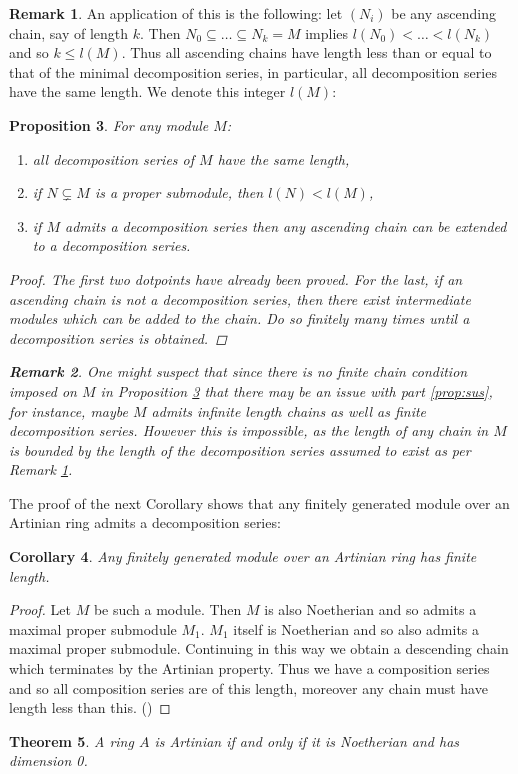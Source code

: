 \documentclass[12pt]{article}
\theoremstyle{plain}
\newtheorem{thm}{Theorem}[subsection] %
\newtheorem{proposition}[thm]{Proposition}
\newtheorem{cor}[thm]{Corollary}
\theoremstyle{definition}
\newtheorem{remark}[thm]{Remark}
\begin{document}
	\begin{remark}
		\label{remark:saving_grace}
		An application of this is the following: let $(N_i)$ be any ascending chain, say of length $k$. Then $N_0 \subseteq \hdots \subseteq N_k = M$ implies $l(N_0) < \hdots < l(N_k)$ and so $k \leq l(M)$. Thus all ascending chains have length less than or equal to that of the minimal decomposition series, in particular, all decomposition series have the same length. We denote this integer $l(M)$:
	\end{remark}
	\begin{proposition}
		\label{prop:decomposition_series_basics}
		For any module $M$:
		\begin{enumerate}
			\item all decomposition series of $M$ have the same length,
			\item if $N \subsetneq M$ is a proper submodule, then $l(N)<l(M)$,
			\item\label{prop:sus} if $M$ admits a decomposition series then any ascending chain can be extended to a decomposition series.
		\end{enumerate}
		\begin{proof}
			The first two dotpoints have already been proved. For the last, if an ascending chain is not a decomposition series, then there exist intermediate modules which can be added to the chain. Do so finitely many times until a decomposition series is obtained.
		\end{proof}
		\begin{remark}
			One might suspect that since there is no finite chain condition imposed on $M$ in Proposition \ref{prop:decomposition_series_basics} that there may be an issue with part \ref{prop:sus}, for instance, maybe $M$ admits infinite length chains as well as finite decomposition series. However this is impossible, as the length of any chain in $M$ is bounded by the length of the decomposition series assumed to exist as per Remark \ref{remark:saving_grace}.
		\end{remark}
	\end{proposition}
	The proof of the next Corollary shows that any finitely generated module over an Artinian ring admits a decomposition series:
	\begin{cor}
		Any finitely generated module over an Artinian ring has finite length.
	\end{cor}
	\begin{proof}
		Let $M$ be such a module. Then $M$ is also Noetherian and so admits a maximal proper submodule $M_1$. $M_1$ itself is Noetherian and so also admits a maximal proper submodule. Continuing in this way we obtain a descending chain which terminates by the Artinian property. Thus we have a composition series and so all composition series are of this length, moreover any chain must have length less than this. (\cite[\S 6]{atiyah_macdonald})
	\end{proof}
	\begin{thm}
		\label{prop:artinian_Noeth_dimzero} A ring $A$ is Artinian if and only if it is Noetherian and has dimension 0.
	\end{thm}
	
\end{document}
